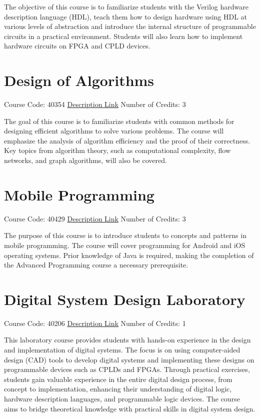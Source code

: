 The objective of this course is to familiarize students with the Verilog hardware description language (HDL), teach them how to design hardware using HDL at various levels of abstraction and introduce the internal structure of programmable circuits in a practical environment. Students will also learn how to implement hardware circuits on FPGA and CPLD devices.

\section{Design of Algorithms}
Course Code: 40354 \qquad \quad \href{https://docs.ce.sharif.edu/course/40354}{Description Link}
\qquad \quad Number of Credits: 3

The goal of this course is to familiarize students with common methods for designing efficient algorithms to solve various problems. The course will emphasize the analysis of algorithm efficiency and the proof of their correctness. Key topics from algorithm theory, such as computational complexity, flow networks, and graph algorithms, will also be covered.

\section{Mobile Programming}
Course Code: 40429 \qquad \quad \href{https://docs.ce.sharif.edu/course/40429}{Description Link}
\qquad \quad Number of Credits: 3

The purpose of this course is to introduce students to concepts and patterns in mobile programming. The course will cover programming for Android and iOS operating systems. Prior knowledge of Java is required, making the completion of the Advanced Programming course a necessary prerequisite.

\section{Digital System Design Laboratory}
Course Code: 40206 \qquad \quad \href{https://docs.ce.sharif.edu/course/40206}{Description Link}
\qquad \quad Number of Credits: 1

This laboratory course provides students with hands-on experience in the design and implementation of digital systems. The focus is on using computer-aided design (CAD) tools to develop digital systems and implementing these designs on programmable devices such as CPLDs and FPGAs. Through practical exercises, students gain valuable experience in the entire digital design process, from concept to implementation, enhancing their understanding of digital logic, hardware description languages, and programmable logic devices. The course aims to bridge theoretical knowledge with practical skills in digital system design.


